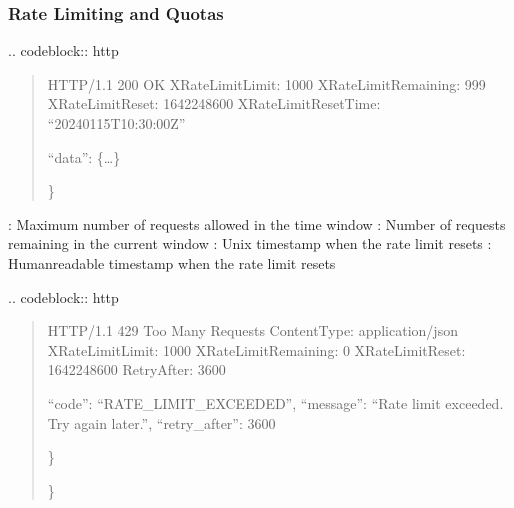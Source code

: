 \documentclass[letterpaper,10pt,english]{sphinxmanual}
\begin{document}
\subsubsection{Rate Limiting and Quotas}
\label{\detokenize{api/index:rate-limiting-and-quotas}}
\sphinxAtStartPar
{}
.. code\sphinxhyphen{}block:: http
\begin{quote}

\sphinxAtStartPar
HTTP/1.1 200 OK
X\sphinxhyphen{}RateLimit\sphinxhyphen{}Limit: 1000
X\sphinxhyphen{}RateLimit\sphinxhyphen{}Remaining: 999
X\sphinxhyphen{}RateLimit\sphinxhyphen{}Reset: 1642248600
X\sphinxhyphen{}RateLimit\sphinxhyphen{}Reset\sphinxhyphen{}Time: “2024\sphinxhyphen{}01\sphinxhyphen{}15T10:30:00Z”
\begin{description}
\sphinxlineitem{\{}
\sphinxAtStartPar
“data”: \{…\}

\end{description}

\sphinxAtStartPar
\}
\end{quote}

\sphinxAtStartPar
{}
\sphinxhyphen{} : Maximum number of requests allowed in the time window
\sphinxhyphen{} : Number of requests remaining in the current window
\sphinxhyphen{} : Unix timestamp when the rate limit resets
\sphinxhyphen{} : Human\sphinxhyphen{}readable timestamp when the rate limit resets

\sphinxAtStartPar
{}
.. code\sphinxhyphen{}block:: http
\begin{quote}

\sphinxAtStartPar
HTTP/1.1 429 Too Many Requests
Content\sphinxhyphen{}Type: application/json
X\sphinxhyphen{}RateLimit\sphinxhyphen{}Limit: 1000
X\sphinxhyphen{}RateLimit\sphinxhyphen{}Remaining: 0
X\sphinxhyphen{}RateLimit\sphinxhyphen{}Reset: 1642248600
Retry\sphinxhyphen{}After: 3600
\begin{description}
\sphinxlineitem{\{}\begin{description}
\sphinxAtStartPar
“code”: “RATE\_LIMIT\_EXCEEDED”,
“message”: “Rate limit exceeded. Try again later.”,
“retry\_after”: 3600

\end{description}

\sphinxAtStartPar
\}

\end{description}

\sphinxAtStartPar
\}
\end{quote}
\end{document}
